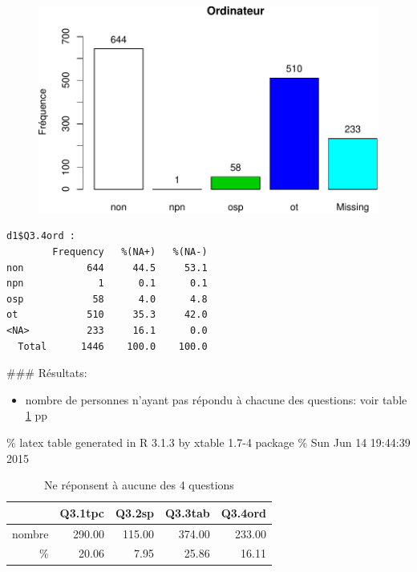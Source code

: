 \documentclass[]{article}
\begin{document}
\begin{figure}[htbp]
\centering
\includegraphics{qs_etudiants_files/figure-latex/outils-4.pdf}
\end{figure}

\begin{verbatim}
d1$Q3.4ord : 
        Frequency   %(NA+)   %(NA-)
non           644     44.5     53.1
npn             1      0.1      0.1
osp            58      4.0      4.8
ot            510     35.3     42.0
<NA>          233     16.1      0.0
  Total      1446    100.0    100.0
\end{verbatim}

\#\#\# Résultats:

\begin{itemize}
\itemsep1pt\parskip0pt
\item
  nombre de personnes n'ayant pas répondu à chacune des questions: voir
  table \ref{lab.tnr} pp \pageref{lab.tnr}
\end{itemize}

\% latex table generated in R 3.1.3 by xtable 1.7-4 package \% Sun Jun
14 19:44:39 2015

\begin{table}[ht]
\centering
\begin{tabular}{rrrrr}
  \hline
 & Q3.1tpc & Q3.2sp & Q3.3tab & Q3.4ord \\ 
  \hline
nombre & 290.00 & 115.00 & 374.00 & 233.00 \\ 
   \%  & 20.06 & 7.95 & 25.86 & 16.11 \\ 
   \hline
\end{tabular}
\caption{Ne réponsent à aucune des 4 questions} 
\label{lab.tnr}
\end{table}
\end{document}
